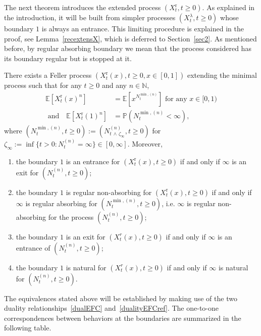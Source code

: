 \documentclass[AHL,Unicode,longabstracts,published]{cedram}
\newcommand{\rmr}{\mathrm{r}}
\newcommand{\bbN}{\mathbb{N}}
\newcommand{\bbE}{\mathbb{E}}
\newcommand{\bbP}{\mathbb{P}}
\newcommand*{\romanenumi}{\renewcommand*{\theenumi}{\roman{enumi}}}
\begin{document}
The next theorem introduces the extended process $(X_t^{\rmr},t\geq 0)$. As explained in the introduction, it will be built from simpler processes $(X_t^{\lambda},t\geq 0)$ whose boundary $1$ is always an entrance. This limiting procedure is explained in the proof, see Lemma~\ref{recextensX}, which is deferred to Section~\ref{sec2}. As mentioned before, by regular absorbing boundary we mean that the process considered has its boundary regular but is stopped at it.

\begin{theo}\label{thmmomentduality2}
There exists a Feller process $(X_t^{\rmr}(x),t\geq 0, x\in [0,1])$ extending the minimal process such that for any $t\geq 0$ and any $n\in \bbN$,
\begin{equation}\label{dualityEFCref}
\begin{split}
\bbE\left[X^{\rmr}_t(x)^n\right] &=\bbE\left[x^{N^{\min,(n)}_t}\right] \text{ for any } x\in [0,1) \\
\text{ and}\quad \bbE\left[X^{\rmr}_t(1)^n\right] &=\bbP\left(N^{\min,(n)}_t<\infty\right),
\end{split}
\end{equation}
where $(N^{\min,(n)}_t,t\geq 0):=(N_{t\,\wedge\, \zeta_{\infty}}^{(n)},t\geq 0)$ for $\zeta_{\infty}:=\inf\{t>0: N_t^{(n)}=\infty\}\in [0,\infty]$. Moreover,
\begin{enumerate}\romanenumi
\item\label{theo2.7.i} the boundary $1$ is an entrance for $(X^{\rmr}_t(x),t\geq 0)$ if and only if $\infty$ is an exit for $(N^{(n)}_t,t\geq 0)$;
\item\label{theo2.7.ii} the boundary $1$ is regular non-absorbing for $(X^{\rmr}_t(x),t\geq 0)$ if and only if $\infty$ is regular absorbing for $(N^{\min,(n)}_t,t\geq 0)$, i.e. $\infty$ is regular non-absorbing for the process $(N^{(n)}_t,t\geq 0)$;
\item\label{theo2.7.iii} the boundary $1$ is an exit for $(X^{r}_t(x),t\geq 0)$ if and only if $\infty$ is an entrance of $(N^{(n)}_t,t\geq 0)$;
\item\label{theo2.7.iv} the boundary $1$ is natural for $(X^{r}_t(x),t\geq 0)$ if and only if $\infty$ is natural for $(N^{(n)}_t,t\geq 0)$.
\end{enumerate}
\end{theo}

The equivalences stated above will be established by making use of the two duality relationships~\eqref{dualEFC} and~\eqref{dualityEFCref}. The one-to-one correspondences between behaviors at the boundaries are summarized in the following table.
\end{document}
